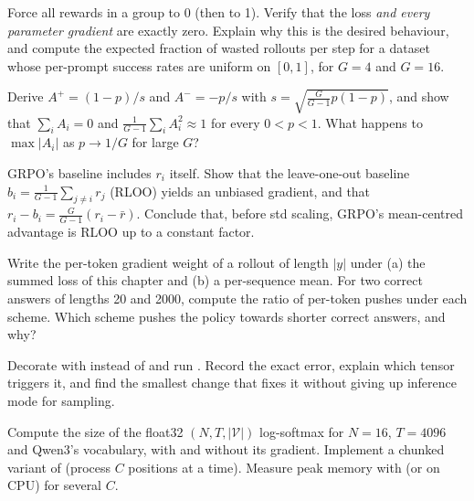 \begin{exercise}
Force all rewards in a group to 0 (then to 1). Verify that the loss \emph{and every
parameter gradient} are exactly zero. Explain why this is the desired behaviour, and
compute the expected fraction of wasted rollouts per step for a dataset whose per-prompt
success rates are uniform on $[0,1]$, for $G=4$ and $G=16$.
\end{exercise}

\begin{exercise}
Derive $A^+=(1-p)/s$ and $A^-=-p/s$ with $s=\sqrt{\frac{G}{G-1}p(1-p)}$, and show that
$\sum_iA_i=0$ and $\frac1{G-1}\sum_iA_i^2\approx1$ for every $0<p<1$. What happens to
$\max|A_i|$ as $p\to 1/G$ for large $G$?
\end{exercise}

\begin{exercise}
GRPO's baseline includes $r_i$ itself. Show that the leave-one-out baseline
$b_i=\frac1{G-1}\sum_{j\ne i}r_j$ (RLOO) yields an unbiased gradient, and that
$r_i-b_i=\frac{G}{G-1}(r_i-\bar r)$. Conclude that, before std scaling, GRPO's mean-centred
advantage is RLOO up to a constant factor.
\end{exercise}

\begin{exercise}
Write the per-token gradient weight of a rollout of length $|y|$ under (a) the summed loss
of this chapter and (b) a per-sequence mean. For two correct answers of lengths 20 and 2000,
compute the ratio of per-token pushes under each scheme. Which scheme pushes the policy
towards shorter correct answers, and why?
\end{exercise}

\begin{exercise}
Decorate  with \allowbreak{} instead of
 and run . Record the exact error,
explain which tensor triggers it, and find the smallest change that fixes it without
giving up inference mode for sampling.
\end{exercise}

\begin{exercise}
Compute the size of the float32 $(N,T,|\mathcal V|)$ log-softmax for $N=16$,
$T=4096$ and Qwen3's vocabulary, with and without its gradient. Implement a chunked
variant of  (process $C$ positions at a time). Measure peak memory
with  (or  on CPU) for several $C$.
\end{exercise}

